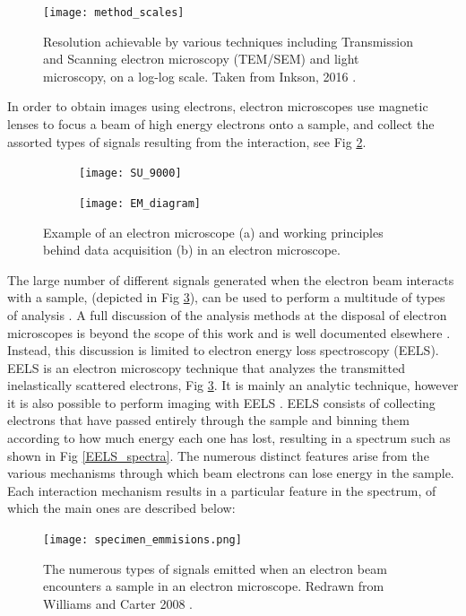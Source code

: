 \begin{figure}
	\centering
	\texttt{[image: method\_scales]}
	\caption{Resolution achievable by various techniques including Transmission and Scanning electron microscopy (TEM/SEM) and light microscopy, on a log-log scale.  Taken from Inkson, 2016 \cite{inkson_2_2016}.}
	\label{method_scales}
	
\end{figure}


In order to obtain images using electrons, electron microscopes use magnetic lenses to focus a beam of high energy electrons onto a sample, and collect the assorted types of signals resulting from the interaction, see Fig \ref{em_diagram}.\\


\begin{figure}
\begin{subfigure}{0.45\textwidth}
	\texttt{[image: SU\_9000]}
	\caption{}
\end{subfigure}
\hspace{0.05cm}
\begin{subfigure}{0.45\textwidth}
	\texttt{[image: EM\_diagram]}
	\caption{}
\end{subfigure}
	\caption{Example of an electron microscope (a) and working principles behind data acquisition (b) in an electron microscope. }
	\label{em_diagram}
\end{figure}

The large number of different signals generated when the electron beam interacts with a sample, (depicted in Fig \ref{specimen_emmisions}), can be used to perform a multitude of types of analysis \cite{williams_transmission_2008}.  A full discussion of the analysis methods at the disposal of electron microscopes is beyond the scope of this work and is well documented elsewhere \cite{goldstein_electron_2003,Egerton,williams_transmission_2008,reimer_electron_1998}.  Instead, this discussion is limited to electron energy loss spectroscopy (EELS).  EELS is an electron microscopy technique that analyzes the transmitted inelastically scattered electrons, Fig \ref{specimen_emmisions}\cite{Egerton}.  It is mainly an analytic technique, however it is also possible to perform imaging with EELS \cite{varela_stem-eels_2012}.  EELS consists of collecting electrons that have passed entirely through the sample and binning them according to how much energy each one has lost, resulting in a spectrum such as shown in Fig \ref{EELS_spectra}.  The numerous distinct features arise from the various mechanisms through which beam electrons can lose energy in the sample.  Each interaction mechanism results in a particular feature in the spectrum, of which the main ones are described below:
\begin{figure}
	\centering
	\texttt{[image: specimen\_emmisions.png]}
	\caption{The numerous types of signals emitted when an electron beam encounters a sample in an electron microscope.   Redrawn from Williams and Carter 2008 \cite{williams_transmission_2008}.  }
	\label{specimen_emmisions}
\end{figure}


